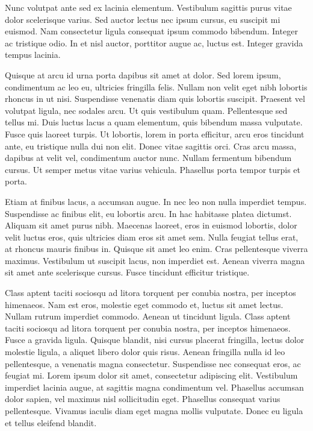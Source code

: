 Nunc volutpat ante sed ex lacinia elementum. Vestibulum sagittis purus vitae dolor scelerisque varius. Sed auctor lectus nec ipsum cursus, eu suscipit mi euismod. Nam consectetur ligula consequat ipsum commodo bibendum. Integer ac tristique odio. In et nisl auctor, porttitor augue ac, luctus est. Integer gravida tempus lacinia.

Quisque at arcu id urna porta dapibus sit amet at dolor. Sed lorem ipsum, condimentum ac leo eu, ultricies fringilla felis. Nullam non velit eget nibh lobortis rhoncus in ut nisi. Suspendisse venenatis diam quis lobortis suscipit. Praesent vel volutpat ligula, nec sodales arcu. Ut quis vestibulum quam. Pellentesque sed tellus mi. Duis luctus lacus a quam elementum, quis bibendum massa vulputate. Fusce quis laoreet turpis. Ut lobortis, lorem in porta efficitur, arcu eros tincidunt ante, eu tristique nulla dui non elit. Donec vitae sagittis orci. Cras arcu massa, dapibus at velit vel, condimentum auctor nunc. Nullam fermentum bibendum cursus. Ut semper metus vitae varius vehicula. Phasellus porta tempor turpis et porta.

Etiam at finibus lacus, a accumsan augue. In nec leo non nulla imperdiet tempus. Suspendisse ac finibus elit, eu lobortis arcu. In hac habitasse platea dictumst. Aliquam sit amet purus nibh. Maecenas laoreet, eros in euismod lobortis, dolor velit luctus eros, quis ultricies diam eros sit amet sem. Nulla feugiat tellus erat, at rhoncus mauris finibus in. Quisque sit amet leo enim. Cras pellentesque viverra maximus. Vestibulum ut suscipit lacus, non imperdiet est. Aenean viverra magna sit amet ante scelerisque cursus. Fusce tincidunt efficitur tristique.

Class aptent taciti sociosqu ad litora torquent per conubia nostra, per inceptos himenaeos. Nam est eros, molestie eget commodo et, luctus sit amet lectus. Nullam rutrum imperdiet commodo. Aenean ut tincidunt ligula. Class aptent taciti sociosqu ad litora torquent per conubia nostra, per inceptos himenaeos. Fusce a gravida ligula. Quisque blandit, nisi cursus placerat fringilla, lectus dolor molestie ligula, a aliquet libero dolor quis risus. Aenean fringilla nulla id leo pellentesque, a venenatis magna consectetur. Suspendisse nec consequat eros, ac feugiat mi. Lorem ipsum dolor sit amet, consectetur adipiscing elit. Vestibulum imperdiet lacinia augue, at sagittis magna condimentum vel. Phasellus accumsan dolor sapien, vel maximus nisl sollicitudin eget. Phasellus consequat varius pellentesque. Vivamus iaculis diam eget magna mollis vulputate. Donec eu ligula et tellus eleifend blandit.

